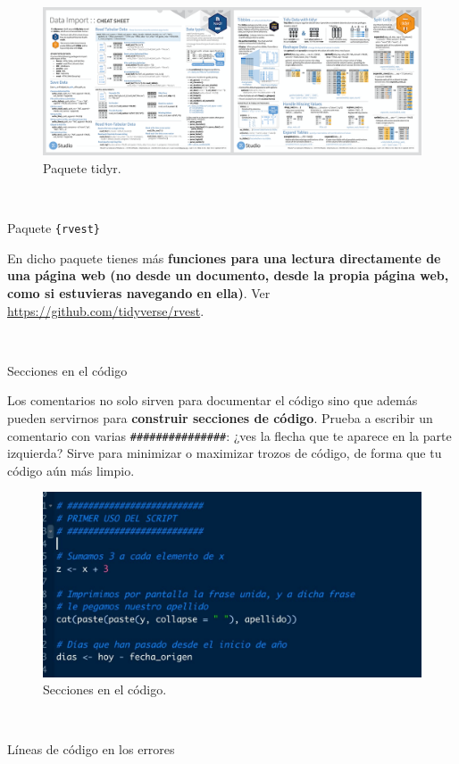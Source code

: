 \documentclass[11pt,]{book}
\begin{document}
\begin{figure}

{\centering \includegraphics[width=0.95\linewidth]{./img/tidyr} 

}

\caption{Paquete tidyr.}\label{fig:tidyr}
\end{figure}

~

Paquete \texttt{\{rvest\}}

En dicho paquete tienes más \textbf{funciones para una lectura directamente de una página web (no desde un documento, desde la propia página web, como si estuvieras navegando en ella)}. Ver \url{https://github.com/tidyverse/rvest}.

~

Secciones en el código

Los comentarios no solo sirven para documentar el código sino que además pueden servirnos para \textbf{construir secciones de código}. Prueba a escribir un comentario con varias \texttt{\#\#\#\#\#\#\#\#\#\#\#\#\#\#\#}: ¿ves la flecha que te aparece en la parte izquierda? Sirve para minimizar o maximizar trozos de código, de forma que tu código aún más limpio.

\begin{figure}

{\centering \includegraphics[width=0.5\linewidth]{./img/indice} 

}

\caption{Secciones en el código.}\label{fig:indice}
\end{figure}

~

Líneas de código en los errores
\end{document}
